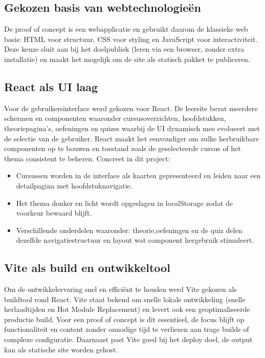 \subsection{Gekozen basis van webtechnologieën}%
\label{sec:basis-webtechnologieën}
De proof of concept is een webapplicatie en gebruikt daarom de klassieke web basis: HTML voor structuur, CSS voor styling en JavaScript voor interactiviteit.
Deze keuze sluit aan bij het doelpubliek (leren via een browser, zonder extra installatie) en maakt het mogelijk om de site als statisch pakket te publiceren.

\subsection{React als UI laag}%
\label{sec:React-ui}
Voor de gebruikersinterface werd gekozen voor React.
De leersite bevat meerdere schermen en componenten waaronder cursusoverzichten, hoofdstukken, theoriepagina’s, oefeningen en quizes waarbij de UI dynamisch mee evolueert met de selectie van de gebruiker.
React maakt het eenvoudiger om zulke herbruikbare componenten op te bouwen en toestand zoals de geselecteerde cursus of het thema consistent te beheren.
Concreet in dit project:
\begin{itemize}
  \item Cursussen worden in de interface als kaarten gepresenteerd en leiden naar een detailpagina met hoofdstuknavigatie.
  \item Het thema donker en licht wordt opgeslagen in localStorage zodat de voorkeur bewaard blijft.
  \item Verschillende onderdelen waaronder: theorie,oefeningen en de quiz delen dezelfde navigatiestructuur en layout wat component hergebruik stimuleert.
\end{itemize}

\subsection{Vite als build en ontwikkeltool}%
\label{sec:vite-build}
Om de ontwikkelervaring snel en efficiënt te houden werd Vite gekozen als buildtool rond React.
Vite staat bekend om snelle lokale ontwikkeling (snelle herlaadtijden en Hot Module Replacement) en levert ook een geoptimaliseerde productie build.
Voor een proof of concept is dit essentieel, de focus blijft op functionaliteit en content zonder onnodige tijd te verliezen aan trage builds of complexe configuratie.
Daarnaast past Vite goed bij het deploy doel, de output kan als statische site worden gehost.

